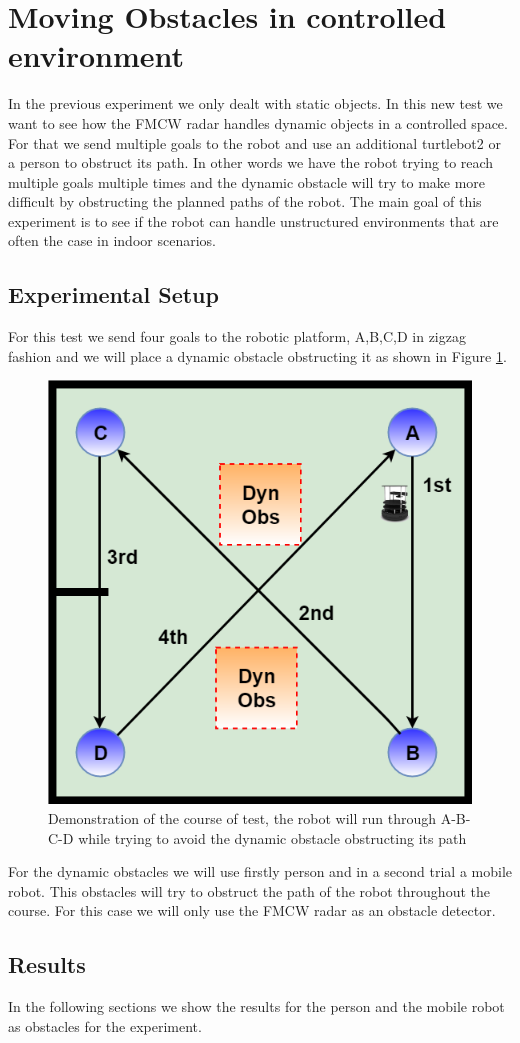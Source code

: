 \section{Moving Obstacles in controlled environment}
In the previous experiment we only dealt with static objects. In this new test we want to see how the \ac{FMCW} \ac{radar} handles dynamic objects in a controlled space. For that we send multiple goals  to the robot and use an additional turtlebot2 or a person to obstruct its path. In other words we have the robot trying to reach multiple goals multiple times and the dynamic obstacle will try to make more difficult by obstructing the planned paths of the robot.  The main goal of this experiment is to see if the robot can handle unstructured environments that are often the case in indoor scenarios.
\subsection{Experimental Setup}
For this test we send four goals to the robotic platform, A,B,C,D in zigzag fashion and we will place a dynamic obstacle obstructing it as shown in Figure \ref{fig:exp3}.

\begin{figure}[ht!]
\centerline{\includegraphics [width=0.5 \textwidth]{imgs/chapter5/exp3.png}}
\caption[Demonstration of the course of test]{Demonstration of the course of test, the robot will run through A-B-C-D  while  trying to avoid the dynamic obstacle obstructing its path}
\label{fig:exp3}
\end{figure}
For the dynamic obstacles we will use firstly person and in a second trial a mobile robot. This obstacles will try to obstruct the path of the robot throughout the course. For this case we will only use the \ac{FMCW} \ac{radar} as an obstacle detector.


\subsection{Results}
In the following sections we show the results for the person and the mobile robot as obstacles for the experiment.

